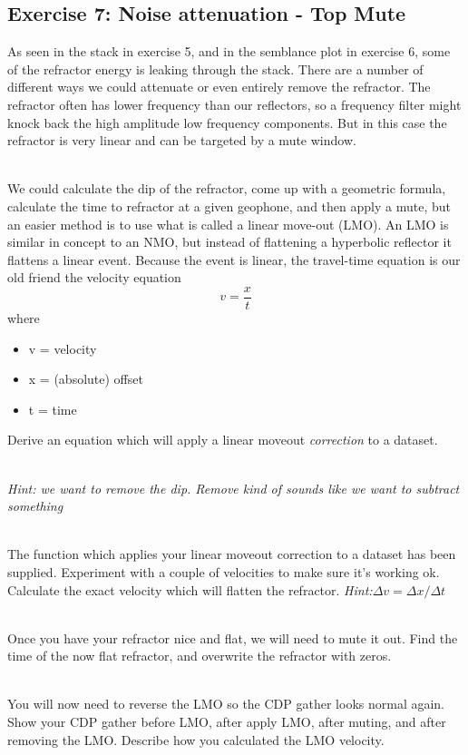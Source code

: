 \subsection*{Exercise 7: Noise attenuation - Top Mute}
As seen in the stack in exercise 5, and in the semblance plot in exercise 6, some of the refractor energy is leaking through the stack.  There are a number of different ways we could attenuate or even entirely remove the refractor.  The refractor often has lower frequency than our reflectors, so a frequency filter might knock back the high amplitude low frequency components. But in this case the refractor is very linear and can be targeted by a mute window.
\par~\\
We could calculate the dip of the refractor, come up with a geometric formula, calculate the time to refractor at a given geophone, and then apply a mute, but an easier method is to use what is called a linear move-out (LMO).  An LMO is similar in concept to an NMO, but instead of flattening a hyperbolic reflector it flattens a linear event.  Because the event is linear, the travel-time equation is our old friend the velocity equation
\[ v = \frac{x}{t} \]
where
\begin{itemize}
\item v = velocity
\item x = (absolute) offset
\item t = time
\end{itemize}
Derive an equation which will apply a linear moveout \emph{correction} to a dataset.  
\par~\\
\emph{Hint: we want to remove the dip.  Remove kind of sounds like we want to subtract something}
\par~\\
The function which applies your linear moveout correction to a dataset has been supplied. Experiment with a couple of velocities to make sure it's working ok.  Calculate the exact velocity which will flatten the refractor.
\emph{Hint:$\Delta v = \Delta x/\Delta t$}
\par~\\
Once you have your refractor nice and flat, we will need to mute it out.  Find the time of the now flat refractor, and overwrite the refractor with zeros. 
\par~\\
You will now need to reverse the LMO so the CDP gather looks normal again.  Show your CDP gather before LMO, after apply LMO, after muting, and after removing the LMO. Describe how you calculated the LMO velocity.

